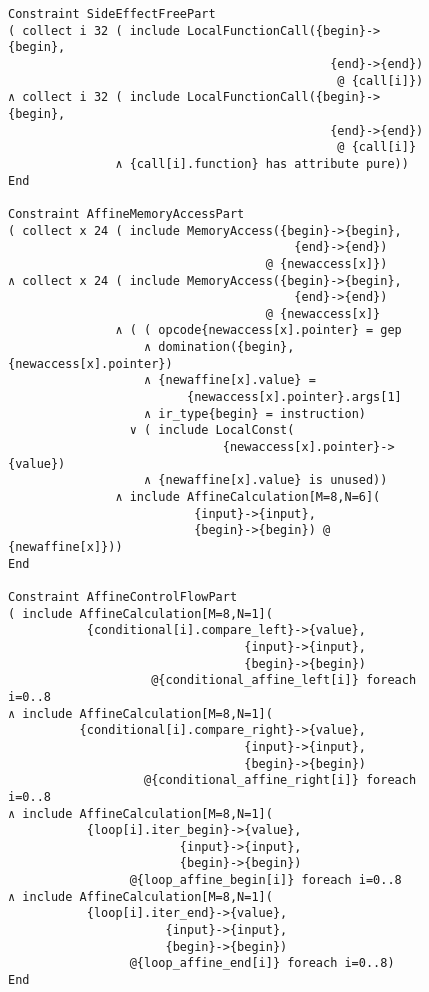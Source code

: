 \begin{figure}[p]
\begin{lstlisting}[language=IDL,basicstyle=\linespread{0.8}\small\ttfamily,
                   firstnumber=38]
Constraint SideEffectFreePart
( collect i 32 ( include LocalFunctionCall({begin}->{begin},
                                             {end}->{end})
                                              @ {call[i]}) 
∧ collect i 32 ( include LocalFunctionCall({begin}->{begin},
                                             {end}->{end})
                                              @ {call[i]}
               ∧ {call[i].function} has attribute pure))
End

Constraint AffineMemoryAccessPart
( collect x 24 ( include MemoryAccess({begin}->{begin},
                                        {end}->{end})
                                    @ {newaccess[x]})
∧ collect x 24 ( include MemoryAccess({begin}->{begin},
                                        {end}->{end})
                                    @ {newaccess[x]}
               ∧ ( ( opcode{newaccess[x].pointer} = gep
                   ∧ domination({begin}, {newaccess[x].pointer})
                   ∧ {newaffine[x].value} =
                         {newaccess[x].pointer}.args[1]
                   ∧ ir_type{begin} = instruction)
                 ∨ ( include LocalConst(
                              {newaccess[x].pointer}->{value})
                   ∧ {newaffine[x].value} is unused))
               ∧ include AffineCalculation[M=8,N=6](
                          {input}->{input},
                          {begin}->{begin}) @ {newaffine[x]}))
End

Constraint AffineControlFlowPart
( include AffineCalculation[M=8,N=1](
           {conditional[i].compare_left}->{value},
                                 {input}->{input},
                                 {begin}->{begin})
                    @{conditional_affine_left[i]} foreach i=0..8
∧ include AffineCalculation[M=8,N=1](
          {conditional[i].compare_right}->{value},
                                 {input}->{input},
                                 {begin}->{begin})
                   @{conditional_affine_right[i]} foreach i=0..8
∧ include AffineCalculation[M=8,N=1](
           {loop[i].iter_begin}->{value},
                        {input}->{input},
                        {begin}->{begin})
                 @{loop_affine_begin[i]} foreach i=0..8
∧ include AffineCalculation[M=8,N=1](
           {loop[i].iter_end}->{value},
                      {input}->{input},
                      {begin}->{begin})
                 @{loop_affine_end[i]} foreach i=0..8)
End
\end{lstlisting}
\end{figure}
